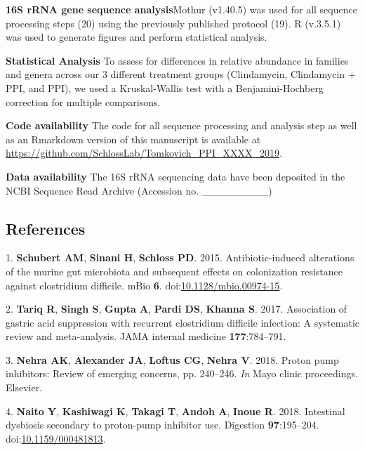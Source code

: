 \documentclass[11pt,]{article}
\begin{document}
\textbf{16S rRNA gene sequence analysis}Mothur (v1.40.5) was used for
all sequence processing steps (20) using the previously published
protocol (19). R (v.3.5.1) was used to generate figures and perform
statistical analysis.

\textbf{Statistical Analysis} To assess for differences in relative
abundance in families and genera across our 3 different treatment groups
(Clindamycin, Clindamycin + PPI, and PPI), we used a Kruskal-Wallis test
with a Benjamini-Hochberg correction for multiple comparisons.

\textbf{Code availability} The code for all sequence processing and
analysis step as well as an Rmarkdown version of this manuscript is
available at
\url{https://github.com/SchlossLab/Tomkovich_PPI_XXXX_2019}.

\textbf{Data availability} The 16S rRNA sequencing data have been
deposited in the NCBI Sequence Read Archive (Accession no.
\_\_\_\_\_\_\_\_\_)

\newpage

\subsection{References}\label{references}

\hypertarget{refs}{}
\hypertarget{ref-Schubert2015}{}
1. \textbf{Schubert AM}, \textbf{Sinani H}, \textbf{Schloss PD}. 2015.
Antibiotic-induced alterations of the murine gut microbiota and
subsequent effects on colonization resistance against clostridium
difficile. mBio \textbf{6}.
doi:\href{https://doi.org/10.1128/mbio.00974-15}{10.1128/mbio.00974-15}.

\hypertarget{ref-tariq2017association}{}
2. \textbf{Tariq R}, \textbf{Singh S}, \textbf{Gupta A}, \textbf{Pardi
DS}, \textbf{Khanna S}. 2017. Association of gastric acid suppression
with recurrent clostridium difficile infection: A systematic review and
meta-analysis. JAMA internal medicine \textbf{177}:784--791.

\hypertarget{ref-nehra2018proton}{}
3. \textbf{Nehra AK}, \textbf{Alexander JA}, \textbf{Loftus CG},
\textbf{Nehra V}. 2018. Proton pump inhibitors: Review of emerging
concerns, pp. 240--246. \emph{In} Mayo clinic proceedings. Elsevier.

\hypertarget{ref-Naito2018}{}
4. \textbf{Naito Y}, \textbf{Kashiwagi K}, \textbf{Takagi T},
\textbf{Andoh A}, \textbf{Inoue R}. 2018. Intestinal dysbiosis secondary
to proton-pump inhibitor use. Digestion \textbf{97}:195--204.
doi:\href{https://doi.org/10.1159/000481813}{10.1159/000481813}.
\end{document}
